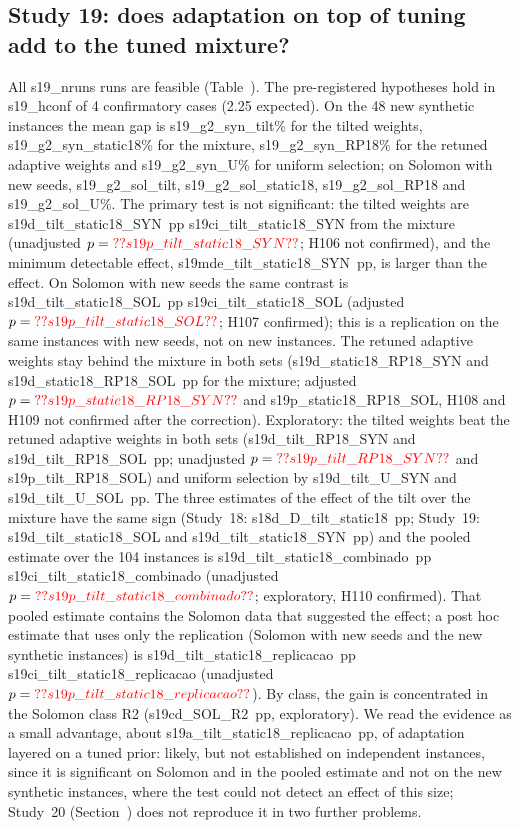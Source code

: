 \subsection{Study 19: does adaptation on top of tuning add to the tuned mixture?}\label{sec:s19}
All \num{s19_nruns} runs are feasible (Table~). The pre-registered hypotheses hold in \num{s19_hconf} of 4 confirmatory cases (2.25 expected). On the 48 new synthetic instances the mean gap is \num{s19_g2_syn_tilt}\% for the tilted weights, \num{s19_g2_syn_static18}\% for the mixture, \num{s19_g2_syn_RP18}\% for the retuned adaptive weights and \num{s19_g2_syn_U}\% for uniform selection; on Solomon with new seeds, \num{s19_g2_sol_tilt}, \num{s19_g2_sol_static18}, \num{s19_g2_sol_RP18} and \num{s19_g2_sol_U}\%. The primary test is not significant: the tilted weights are \num{s19d_tilt_static18_SYN}~pp \num{s19ci_tilt_static18_SYN} from the mixture (unadjusted $p=\num{s19p_tilt_static18_SYN}$; H106 not confirmed), and the minimum detectable effect, \num{s19mde_tilt_static18_SYN}~pp, is larger than the effect. On Solomon with new seeds the same contrast is \num{s19d_tilt_static18_SOL}~pp \num{s19ci_tilt_static18_SOL} (adjusted $p=\num{s19p_tilt_static18_SOL}$; H107 confirmed); this is a replication on the same instances with new seeds, not on new instances. The retuned adaptive weights stay behind the mixture in both sets (\num{s19d_static18_RP18_SYN} and \num{s19d_static18_RP18_SOL}~pp for the mixture; adjusted $p=\num{s19p_static18_RP18_SYN}$ and \num{s19p_static18_RP18_SOL}, H108 and H109 not confirmed after the correction). Exploratory: the tilted weights beat the retuned adaptive weights in both sets (\num{s19d_tilt_RP18_SYN} and \num{s19d_tilt_RP18_SOL}~pp; unadjusted $p=\num{s19p_tilt_RP18_SYN}$ and \num{s19p_tilt_RP18_SOL}) and uniform selection by \num{s19d_tilt_U_SYN} and \num{s19d_tilt_U_SOL}~pp. The three estimates of the effect of the tilt over the mixture have the same sign (Study~18: \num{s18d_D_tilt_static18}~pp; Study~19: \num{s19d_tilt_static18_SOL} and \num{s19d_tilt_static18_SYN}~pp) and the pooled estimate over the 104 instances is \num{s19d_tilt_static18_combinado}~pp \num{s19ci_tilt_static18_combinado} (unadjusted $p=\num{s19p_tilt_static18_combinado}$; exploratory, H110 confirmed). That pooled estimate contains the Solomon data that suggested the effect; a post hoc estimate that uses only the replication (Solomon with new seeds and the new synthetic instances) is \num{s19d_tilt_static18_replicacao}~pp \num{s19ci_tilt_static18_replicacao} (unadjusted $p=\num{s19p_tilt_static18_replicacao}$). By class, the gain is concentrated in the Solomon class R2 (\num{s19cd_SOL_R2}~pp, exploratory). We read the evidence as a small advantage, about \num{s19a_tilt_static18_replicacao}~pp, of adaptation layered on a tuned prior: likely, but not established on independent instances, since it is significant on Solomon and in the pooled estimate and not on the new synthetic instances, where the test could not detect an effect of this size; Study~20 (Section~) does not reproduce it in two further problems.

